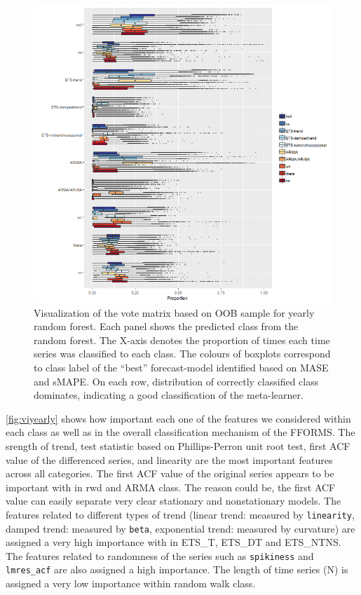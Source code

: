 \documentclass[11pt,a4paper,]{article}
\begin{document}
\begin{figure}
\centering
\includegraphics{figures/yearlyoob-1.png}
\caption{\label{fig:yearlyoob}Visualization of the vote matrix based on OOB
sample for yearly random forest. Each panel shows the predicted class
from the random forest. The X-axis denotes the proportion of times each
time series was classified to each class. The colours of boxplots
correspond to class label of the ``best'' forecast-model identified
based on MASE and sMAPE. On each row, distribution of correctly
classified class dominates, indicating a good classification of the
meta-learner.}
\end{figure}

\autoref{fig:viyearly} shows how important each one of the features we
considered within each class as well as in the overall classification
mechanism of the FFORMS. The srength of trend, test statistic based on
Phillips-Perron unit root test, first ACF value of the differenced
series, and linearity are the most important features across all
categories. The first ACF value of the original series appears to be
important with in rwd and ARMA class. The reason could be, the first ACF
value can easily separate very clear stationary and nonstationary
models. The features related to different types of trend (linear trend:
measured by \texttt{linearity}, damped trend: measured by \texttt{beta},
exponential trend: measured by curvature) are assigned a very high
importance with in ETS\_T, ETS\_DT and ETS\_NTNS. The features related
to randomness of the series such as \texttt{spikiness} and
\texttt{lmres\_acf} are also assigned a high importance. The length of
time series (N) is assigned a very low importance within random walk
class.
\end{document}
